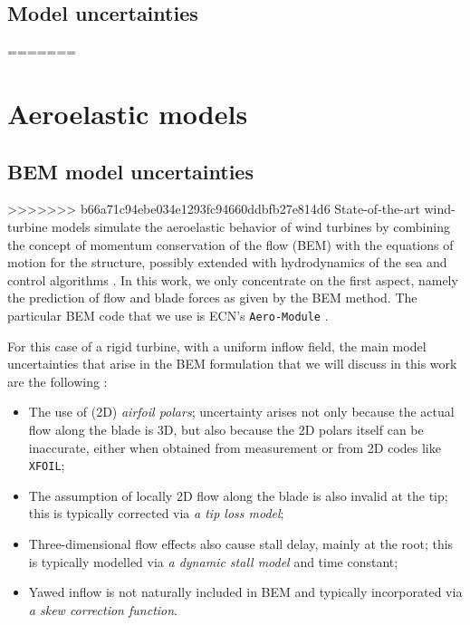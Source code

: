 \documentclass[review]{elsarticle}
\numberwithin{equation}{section}
\numberwithin{equation}{section}
\begin{document}
\subsection{Model uncertainties}
=======
\section{Aeroelastic models}\label{sec:model_description}
\subsection{BEM model uncertainties}
>>>>>>> b66a71c94ebe034e1293fc94660ddbfb27e814d6
State-of-the-art wind-turbine models simulate the aeroelastic behavior of wind turbines by combining the concept of momentum conservation of the flow (BEM) with the equations of motion for the structure, possibly extended with hydrodynamics of the sea and control algorithms \cite{Vorpahl2013}. In this work, we only concentrate on the first aspect, namely the prediction of flow and blade forces as given by the BEM method. The particular BEM code that we use is  ECN's \texttt{Aero-Module} \cite{Boorsma2012}.

For this case of a rigid turbine, with a uniform inflow field, the main model uncertainties that arise in the BEM formulation that we will discuss in this work are the following \cite{Hansen1993}:
\begin{itemize}
\item The use of (2D) \textit{airfoil polars}; uncertainty arises not only because the actual flow along the blade is 3D, but also because the 2D polars itself can be inaccurate, either when obtained from measurement or from 2D codes like \texttt{XFOIL};
\item The assumption of locally 2D flow along the blade is also invalid at the tip; this is typically corrected via \textit{a tip loss model};
\item Three-dimensional flow effects also cause stall delay, mainly at the root; this is typically modelled via \textit{a dynamic stall model }and time constant;
\item Yawed inflow is not naturally included in BEM and typically incorporated via \textit{a skew correction function}.


\end{itemize}
\end{document}
